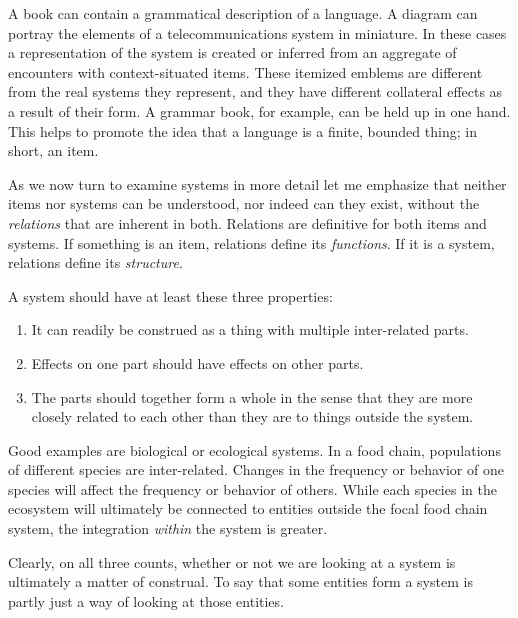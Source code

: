 A book can contain a grammatical description of a language. A diagram 
can portray the elements of a telecommunications system in miniature. In 
these cases a representation of the system is created or inferred 
from an aggregate of encounters with context-situated items. These 
itemized emblems are different from the real systems they 
represent, and they have different collateral effects as a result of 
their form. A grammar book, for example, can be held up in one hand. This helps to promote the idea that a 
language is a finite, bounded thing; in short, an item. 



As we now turn to examine systems in more detail let me emphasize that neither items nor systems can be understood, nor indeed can 
they exist, without the \textit{relations }that are inherent in both. 
Relations are definitive for both items and systems. If something is an item, 
relations define its \textit{functions}. If it is a system, relations 
define its \textit{structure}.



A system should have at least these three properties: 


\begin{enumerate}
\item It can readily be construed as a thing with multiple inter-related parts.

\item Effects on one part should have effects on other parts.

\item The parts should together form a whole in the sense that they are more closely related to each other than they are to things outside the system. 

\end{enumerate}


Good examples are biological or ecological systems. In a food chain, 
populations of different species are inter-related. Changes in the 
frequency or behavior of one species will affect the frequency or 
behavior of others. While each species in the ecosystem will ultimately 
be connected to entities outside the focal food chain system, the 
integration \textit{within }the system is greater. 



Clearly, on all three counts, whether or not we are looking at a system 
is ultimately a matter of construal. %
To say that some entities form a system is partly just a way of looking at those 
entities. 


